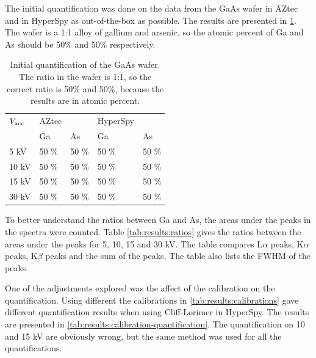 The initial quantification was done on the data from the GaAs wafer in AZtec and in HyperSpy as out-of-the-box as possible.
The results are presented in \cref{tab:initial_quantification}.
The wafer is a 1:1 alloy of gallium and arsenic, so the atomic percent of Ga and As should be 50\% and 50\% respectively.

\begin{table}[h]
    \centering
    \caption{
        Initial quantification of the GaAs wafer.
        The ratio in the wafer is 1:1, so the correct ratio is 50\% and 50\%, because the results are in atomic percent.
    }
    \label{tab:initial_quantification}
    \begin{tabular}{m{1.5cm} m{1.5cm} m{1.5cm} m{1.5cm} m{1.5cm}}
        $V_\textnormal{acc}$ & AZtec &       & HyperSpy &       \\
                             & Ga    & As    & Ga       & As    \\
        \hline
        5 kV                 & 50 \% & 50 \% & 50 \%    & 50 \% \\
        10 kV                & 50 \% & 50 \% & 50 \%    & 50 \% \\
        15 kV                & 50 \% & 50 \% & 50 \%    & 50 \% \\
        30 kV                & 50 \% & 50 \% & 50 \%    & 50 \%
    \end{tabular}
\end{table}

To better understand the ratios between Ga and As, the areas under the peaks in the spectra were counted.
Table \cref{tab:results:ratios} gives the ratios between the areas under the peaks for 5, 10, 15 and 30 kV.
The table compares L$\alpha$ peaks, K$\alpha$ peaks, K$\beta$ peaks and the sum of the peaks.
The table also lists the FWHM of the peaks.




One of the adjustments explored was the affect of the calibration on the quantification.
Using different the calibrations in \cref{tab:results:calibrations} gave different quantification results when using Cliff-Lorimer in HyperSpy. %
The results are presented in \cref{tab:results:calibration-quantification}.
The quantification on 10 and 15 kV are obviously wrong, but the same method was used for all the quantifications.









